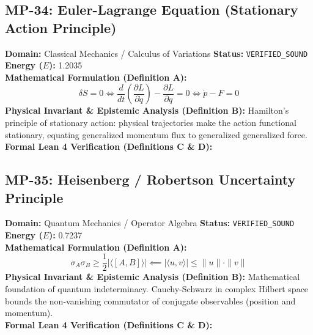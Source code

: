 \subsection{MP-34: Euler-Lagrange Equation (Stationary Action Principle)}
\textbf{Domain:} Classical Mechanics / Calculus of Variations \hfill \textbf{Status:} \texttt{VERIFIED\_SOUND} \hfill \textbf{Energy ($E$):} 1.2035\\
\textbf{Mathematical Formulation (Definition A):}
\begin{equation*}
\delta S = 0 \iff \frac{d}{dt}\left(\frac{\partial L}{\partial \dot{q}}\right) - \frac{\partial L}{\partial q} = 0 \iff \dot{p} - F = 0
\end{equation*}
\textbf{Physical Invariant \& Epistemic Analysis (Definition B):}
Hamilton's principle of stationary action: physical trajectories make the action functional stationary, equating generalized momentum flux to generalized generalized force.\\

\textbf{Formal Lean 4 Verification (Definitions C \& D):}


\vspace{1em}
\subsection{MP-35: Heisenberg / Robertson Uncertainty Principle}
\textbf{Domain:} Quantum Mechanics / Operator Algebra \hfill \textbf{Status:} \texttt{VERIFIED\_SOUND} \hfill \textbf{Energy ($E$):} 0.7237\\
\textbf{Mathematical Formulation (Definition A):}
\begin{equation*}
\sigma_A \sigma_B \ge \frac{1}{2} |\langle [A, B] \rangle| \impliedby |\langle u, v \rangle| \le \|u\| \cdot \|v\|
\end{equation*}
\textbf{Physical Invariant \& Epistemic Analysis (Definition B):}
Mathematical foundation of quantum indeterminacy. Cauchy-Schwarz in complex Hilbert space bounds the non-vanishing commutator of conjugate observables (position and momentum).\\

\textbf{Formal Lean 4 Verification (Definitions C \& D):}


\vspace{1em}
